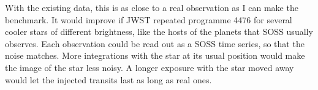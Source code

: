 With the existing data, this is as close to a real observation as I can make
the benchmark. It would improve if JWST
repeated programme 4476 for several cooler stars of different brightness, like the hosts of the planets that SOSS usually observes. Each
observation could be read out as a SOSS time series, so that the noise
matches. More integrations with the star at its usual position would make the
image of the star less noisy. A longer exposure with the star moved away would
let the injected transits last as long as real ones.
